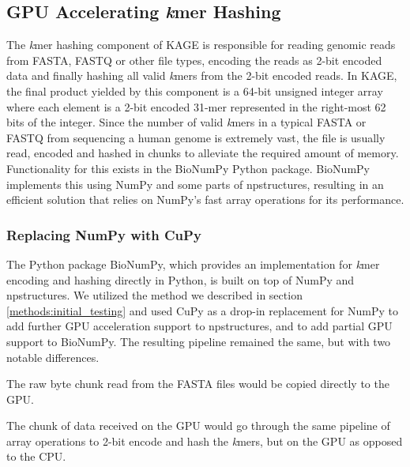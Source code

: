 \subsection{GPU Accelerating \textit{k}mer Hashing} \label{methods:gpu_accelerating_kmer_hashing}
The \textit{k}mer hashing component of KAGE is responsible for reading genomic reads from FASTA, FASTQ or other file types, encoding the reads as 2-bit encoded data and finally hashing all valid \textit{k}mers from the 2-bit encoded reads.
In KAGE, the final product yielded by this component is a 64-bit unsigned integer array where each element is a 2-bit encoded 31-mer represented in the right-most 62 bits of the integer.
Since the number of valid \textit{k}mers in a typical FASTA or FASTQ from sequencing a human genome is extremely vast, the file is usually read, encoded and hashed in chunks to alleviate the required amount of memory.
Functionality for this exists in the BioNumPy Python package.
BioNumPy implements this using NumPy and some parts of npstructures, resulting in an efficient solution that relies on NumPy's fast array operations for its performance.

\subsubsection{Replacing NumPy with CuPy}
The Python package BioNumPy, which provides an implementation for \textit{k}mer encoding and hashing directly in Python, is built on top of NumPy and npstructures.
We utilized the method we described in section \ref{methods:initial_testing} and used CuPy as a drop-in replacement for NumPy to add further GPU acceleration support to npstructures, and to add partial GPU support to BioNumPy.
The resulting pipeline remained the same, but with two notable differences.
\begin{compactenum}
  \item The raw byte chunk read from the FASTA files would be copied directly to the GPU.
  \item The chunk of data received on the GPU would go through the same pipeline of array operations to 2-bit encode and hash the \textit{k}mers, but on the GPU as opposed to the CPU.
\end{compactenum}


